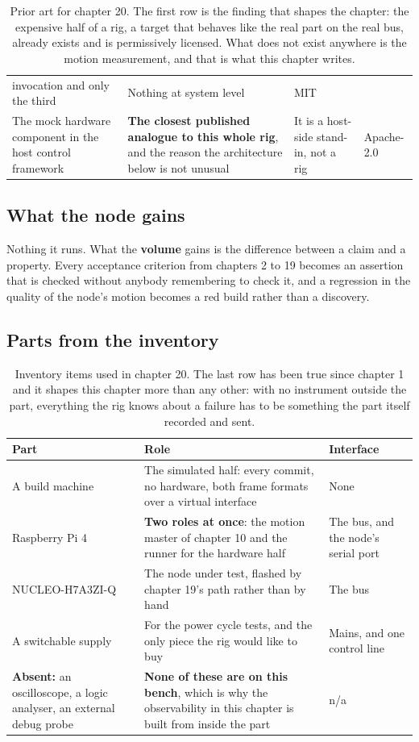 \begin{table}[H]
\begin{tabular}{p{34mm}p{46mm}p{38mm}p{20mm}}
invocation and only the third & Nothing at system level & MIT \\
The mock hardware component in the host control framework & \textbf{The closest
published analogue to this whole rig}, and the reason the architecture below is
not unusual & It is a host-side stand-in, not a rig & Apache-2.0 \\
\bottomrule
\end{tabular}
\caption{Prior art for chapter 20. The first row is the finding that shapes the chapter: the expensive half of a rig, a target that behaves like the real part on the real bus, already exists and is permissively licensed. What does not exist anywhere is the motion measurement, and that is what this chapter writes.}
\end{table}

\subsection*{What the node gains}

Nothing it runs. What the \textbf{volume} gains is the difference between a
claim and a property. Every acceptance criterion from chapters 2 to 19 becomes
an assertion that is checked without anybody remembering to check it, and a
regression in the quality of the node's motion becomes a red build rather than a
discovery.

\subsection*{Parts from the inventory}

\begin{table}[H]\centering\small
\begin{tabular}{p{40mm}p{66mm}p{40mm}}
\toprule
Part & Role & Interface \\
\midrule
A build machine & The simulated half: every commit, no hardware, both frame
formats over a virtual interface & None \\
Raspberry Pi 4 & \textbf{Two roles at once}: the motion master of chapter 10 and
the runner for the hardware half & The bus, and the node's serial port \\
NUCLEO-H7A3ZI-Q & The node under test, flashed by chapter 19's path rather than
by hand & The bus \\
A switchable supply & For the power cycle tests, and the only piece the rig
would like to buy & Mains, and one control line \\
\textbf{Absent:} an oscilloscope, a logic analyser, an external debug probe &
\textbf{None of these are on this bench}, which is why the observability in this
chapter is built from inside the part & n/a \\
\bottomrule
\end{tabular}
\caption{Inventory items used in chapter 20. The last row has been true since chapter 1 and it shapes this chapter more than any other: with no instrument outside the part, everything the rig knows about a failure has to be something the part itself recorded and sent.}
\end{table}

